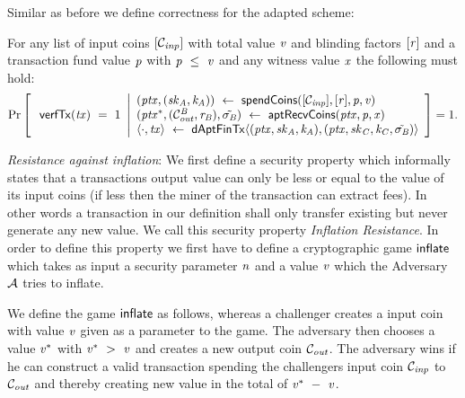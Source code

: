Similar as before we define correctness for the adapted scheme:

\begin{definition}
    \label{def:apt-tx-scheme-correctness}
    For any list of input coins $[\mathcal{C}_{\mathit{inp}}]$ with total value $\mathit{v}$ and blinding factors
    $[\mathit{r}]$ and a transaction fund value $\mathit{p}$ with $\mathit{p} ~\leq~ \mathit{v}$ and any witness value $\mathit{x}$ the following must hold:
    \[
        \Pr\left[
        \begin{array}{c}
            \: \mathsf{verfTx}(\mathit{tx}) ~=~ 1
        \end{array}
        \middle\vert
        \begin{array}{l}
            (\mathit{ptx}, (\mathit{sk}_{\mathit{A}}, \mathit{\mathit{k}_{\mathit{A}}})) ~\leftarrow~ \mathsf{spendCoins}([\mathcal{C}_{\mathit{inp}}],[\mathit{r}],\mathit{p},\mathit{v}) \\
            (\mathit{ptx}^*, (\mathcal{C}_{\mathit{out}}^{\mathit{B}},\mathit{r}_{\mathit{B}}), \tilde{\sigma_{\mathit{B}}}) ~\leftarrow~ \mathsf{aptRecvCoins}(\mathit{ptx},\mathit{p},\mathit{x}) \\
            \langle \cdot, \mathit{tx} \rangle ~\leftarrow~ \mathsf{dAptFinTx} \langle (\mathit{ptx},\mathit{sk}_{\mathit{A}},\mathit{\mathit{k}_{\mathit{A}}}), (\mathit{ptx},\mathit{sk}_{\mathit{C}},\mathit{\mathit{k}_{\mathit{C}}},\tilde{\sigma_{\mathit{B}}}) \rangle
        \end{array}
        \right]=1.
    \]
\end{definition}

\emph{Resistance against inflation}: We first define a security property which informally states that a transactions output value can only be less or equal to the value of its input coins (if less then the miner of the transaction can extract fees).
In other words a transaction in our definition shall only transfer existing but never generate any new value. We call this security property \emph{Inflation Resistance}.
In order to define this property we first have to define a cryptographic game $\mathsf{inflate}$ which takes as input a security parameter $\mathit{n}$ and a value $\mathit{v}$ which the Adversary
$\mathcal{A}$ tries to inflate.

We define the game $\mathsf{inflate}$ as follows, whereas a challenger creates a input coin with value $\mathit{v}$ given as a parameter to the game. The adversary then chooses a value $\mathit{v}^*$ with
$\mathit{v}^* ~>~ \mathit{v}$ and creates a new output coin $\mathcal{C}_{\mathit{out}}$. The adversary wins if he can construct a valid transaction spending the challengers input coin $\mathcal{C}_{\mathit{inp}}$ to $\mathcal{C}_{\mathit{out}}$ and thereby
creating new value in the total of $\mathit{v}^* ~-~ \mathit{v}$.

